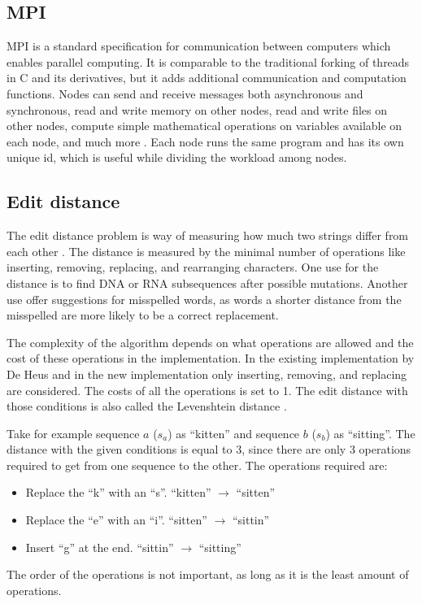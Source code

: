 \subsection{MPI}
MPI is a standard specification for communication between computers which enables parallel computing.
It is comparable to the traditional forking of threads in C and its derivatives, but it adds additional communication and computation functions.
Nodes can send and receive messages both asynchronous and synchronous, read and write memory on other nodes, read and write files on other nodes, compute simple mathematical operations on variables available on each node, and much more \cite{MPI}.
Each node runs the same program and has its own unique id, which is useful while dividing the workload among nodes.

\subsection{Edit distance}\label{bed}
The edit distance problem is way of measuring how much two strings differ from each other \cite{Navarro:2001:GTA:375360.375365}.
The distance is measured by the minimal number of operations like inserting, removing, replacing, and rearranging characters.
One use for the distance is to find DNA or RNA subsequences after possible mutations.
Another use offer suggestions for misspelled words, as words a shorter distance from the misspelled are more likely to be a correct replacement.

The complexity of the algorithm depends on what operations are allowed and the cost of these operations in the implementation.
In the existing implementation by De Heus \cite{Heus} and in the new implementation only inserting, removing, and replacing are considered.
The costs of all the operations is set to 1.
The edit distance with those conditions is also called the Levenshtein distance \cite{Navarro:2001:GTA:375360.375365}.

Take for example sequence $a$ ($s_a$) as ``kitten'' and sequence $b$ ($s_b$) as ``sitting''.
The distance with the given conditions is equal to 3, since there are only 3 operations required to get from one sequence to the other.
The operations required are:
\begin{itemize}
    \item Replace the ``k'' with an ``s''. ``kitten'' $\rightarrow$ ``sitten''
    \item Replace the ``e'' with an ``i''. ``sitten'' $\rightarrow$ ``sittin''
    \item Insert ``g'' at the end. ``sittin'' $\rightarrow$ ``sitting''
\end{itemize}
The order of the operations is not important, as long as it is the least amount of operations.


